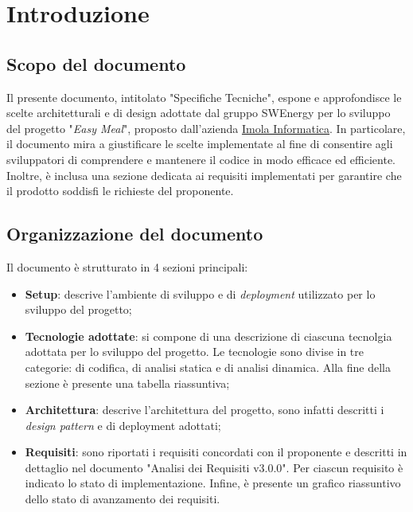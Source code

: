 \section{Introduzione}

\subsection{Scopo del documento}

Il presente documento, intitolato "Specifiche Tecniche", espone e approfondisce
le scelte architetturali e di design adottate dal gruppo SWEnergy per lo
sviluppo del progetto "\textit{Easy Meal}", proposto dall'azienda \href{https://imolainformatica.it}{Imola Informatica}.
In particolare, il documento mira a giustificare le
scelte implementate al fine di consentire agli sviluppatori di comprendere e
mantenere il codice in modo efficace ed efficiente. Inoltre, è inclusa una
sezione dedicata ai requisiti implementati per garantire che il prodotto
soddisfi le richieste del proponente.

\subsection{Organizzazione del documento}

Il documento è strutturato in 4 sezioni principali:

\begin{itemize}
	\item \textbf{Setup}: descrive l'ambiente di sviluppo e di 
		\textit{deployment} utilizzato per lo sviluppo del progetto;

	\item \textbf{Tecnologie adottate}: si compone di una descrizione di
	      ciascuna tecnolgia adottata per lo sviluppo del progetto.
	      Le tecnologie sono divise in tre categorie: di codifica,
	      di analisi statica e di analisi dinamica. Alla fine della sezione è
	      presente una tabella riassuntiva;

	\item \textbf{Architettura}: descrive l'architettura del progetto, sono
		infatti descritti i \textit{design pattern} e di deployment adottati;

	\item \textbf{Requisiti}: sono riportati i requisiti concordati con il
	      proponente e descritti in dettaglio nel documento "Analisi dei
	      Requisiti v3.0.0". Per ciascun requisito è indicato lo
	      stato di implementazione. Infine, è presente un grafico riassuntivo
	      dello stato di avanzamento dei requisiti.
\end{itemize}


